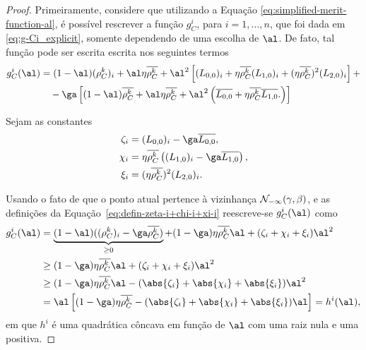 \begin{proof}
 Primeiramente, considere que  utilizando a Equação \eqref{eq:simplified-merit-function-al}, é possível rescrever a função $g_C^i $, para $i=1,\ldots,n$, que foi dada em \eqref{eq:g-Ci_explicit}, somente dependendo de uma escolha de $\al$. De fato, tal função pode ser escrita escrita nos seguintes termos
\[
\begin{aligned}
{g}_C^i (\al)				& = (1-\al)(\rho_C^k )_i+ \al\eta\dbvec{\rho_C^k }+ \al^2\left[(L_{0,0})_i + \eta\dbvec{\rho_C^k } ({L_{1,0}})_i 
				+ (\eta\dbvec{\rho_C^k })^2(L_{2,0})_i \right]  + \\
				& \quad -\ga\left[  (1-\al)\dbvec{\rho_C^k } + \al\eta\dbvec{\rho_C^k } + \al^2\left(\dbvec{L_{0,0}} + \eta\dbvec{\rho_C^k } \dbvec{L_{1,0}}.
\right)  \right]
\end{aligned}
\]

Sejam as constantes
\begin{equation}
\label{eq:defin-zeta-i+chi-i+xi-i}
	\begin{aligned}
\zeta_i & = (L_{0,0})_i - \ga \dbvec{L_{0,0}}, \\
\chi_i  & = \eta\dbvec{\rho_C^k } \left( ({L_{1,0}})_i - \ga\dbvec{L_{1,0}} \right),   \\
\xi_i	& =  (\eta\dbvec{\rho_C^k })^2(L_{2,0})_i . \\ 	
\end{aligned}
\end{equation}



Usando o fato de que o ponto atual pertence à vizinhança $\mathcal{N}_{-\infty}(\gamma,\beta)$, e as definições da Equação~\eqref{eq:defin-zeta-i+chi-i+xi-i} reescreve-se  $g_C^i(\al) $ como
\[
\begin{aligned}
	g_C^i (\al) & = \underbrace{(1-\al)((\rho_C^k )_i - \ga\dbvec{\rho_C^k })}_{\geq 0}  + (1-\ga)\eta\dbvec{\rho_C^k } \al+  (\zeta_i + 				\chi_i + \xi_i)\al^2  \\
				& \geq (1-\ga)\eta\dbvec{\rho_C^k } \al +  (\zeta_i + 				\chi_i + \xi_i)\al^2 \\ 
				& \geq (1-\ga)\eta\dbvec{\rho_C^k } \al -  (\abs{\zeta_i} + \abs{\chi_i} + \abs{\xi_i})\al^2 \\
				& = \al \left[	(1-\ga)\eta\dbvec{\rho_C^k }  -  (\abs{\zeta_i} + \abs{\chi_i} + \abs{\xi_i})\al	\right] = h^i(\al),
\end{aligned}
\]
em que $h^i$ é uma quadrática côncava em função de $\al$ com uma raiz nula e uma positiva. 


\end{proof}
